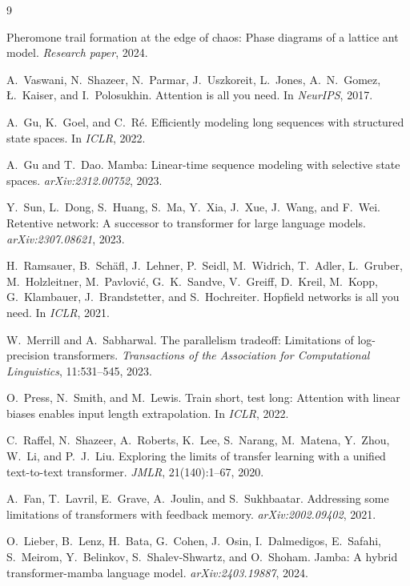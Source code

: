 \documentclass[11pt,a4paper]{article}
\begin{document}

\begin{thebibliography}{9}

Pheromone trail formation at the edge of chaos: Phase diagrams of a
lattice ant model.
\emph{Research paper}, 2024.

A.~Vaswani, N.~Shazeer, N.~Parmar, J.~Uszkoreit, L.~Jones,
A.~N.~Gomez, \L.~Kaiser, and I.~Polosukhin.
Attention is all you need.
In \emph{NeurIPS}, 2017.

A.~Gu, K.~Goel, and C.~R\'{e}.
Efficiently modeling long sequences with structured state spaces.
In \emph{ICLR}, 2022.

A.~Gu and T.~Dao.
Mamba: Linear-time sequence modeling with selective state spaces.
\emph{arXiv:2312.00752}, 2023.

Y.~Sun, L.~Dong, S.~Huang, S.~Ma, Y.~Xia, J.~Xue, J.~Wang, and F.~Wei.
Retentive network: A successor to transformer for large language models.
\emph{arXiv:2307.08621}, 2023.

H.~Ramsauer, B.~Sch\"{a}fl, J.~Lehner, P.~Seidl, M.~Widrich,
T.~Adler, L.~Gruber, M.~Holzleitner, M.~Pavlovi\'{c}, G.~K.~Sandve,
V.~Greiff, D.~Kreil, M.~Kopp, G.~Klambauer, J.~Brandstetter, and
S.~Hochreiter.
Hopfield networks is all you need.
In \emph{ICLR}, 2021.

W.~Merrill and A.~Sabharwal.
The parallelism tradeoff: Limitations of log-precision transformers.
\emph{Transactions of the Association for Computational Linguistics},
11:531--545, 2023.

O.~Press, N.~Smith, and M.~Lewis.
Train short, test long: Attention with linear biases enables input
length extrapolation.
In \emph{ICLR}, 2022.

C.~Raffel, N.~Shazeer, A.~Roberts, K.~Lee, S.~Narang, M.~Matena,
Y.~Zhou, W.~Li, and P.~J.~Liu.
Exploring the limits of transfer learning with a unified text-to-text
transformer.
\emph{JMLR}, 21(140):1--67, 2020.

A.~Fan, T.~Lavril, E.~Grave, A.~Joulin, and S.~Sukhbaatar.
Addressing some limitations of transformers with feedback memory.
\emph{arXiv:2002.09402}, 2021.

O.~Lieber, B.~Lenz, H.~Bata, G.~Cohen, J.~Osin, I.~Dalmedigos,
E.~Safahi, S.~Meirom, Y.~Belinkov, S.~Shalev-Shwartz, and
O.~Shoham.
Jamba: A hybrid transformer-mamba language model.
\emph{arXiv:2403.19887}, 2024.


\end{thebibliography}
\end{document}

